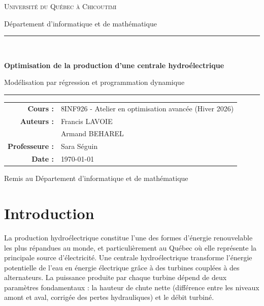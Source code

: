 \documentclass[12pt, letterpaper]{report}
\begin{document}
\begin{titlepage}
  \centering
  \vspace*{2cm}

  {\Large\scshape Université du Québec à Chicoutimi\par}
  \vspace{0.4cm}
  {\normalsize Département d'informatique et de mathématique\par}

  \vspace{2.5cm}

  \rule{\linewidth}{0.6pt}\\[0.6em]
  {\LARGE\bfseries\color{accent} Optimisation de la production d'une centrale hydroélectrique\par}
  \vspace{0.3em}
  {\large Modélisation par régression et programmation dynamique\par}
  \rule{\linewidth}{0.6pt}

  \vspace{2cm}

  \begin{tabular}{rl}
    \textbf{Cours :} & 8INF926 - Atelier en optimisation avancée (Hiver 2026) \\[4pt]
    \textbf{Auteurs :} & Francis LAVOIE \\
                       & Armand BEHAREL \\[4pt]
    \textbf{Professeure :} & Sara Séguin \\[8pt]
    \textbf{Date :} & \today \\
  \end{tabular}

  \vfill

  {\small\textcolor{codegray}{Remis au Département d'informatique et de mathématique}}

\end{titlepage}
\tableofcontents
\newpage

\chapter{Introduction}

La production hydroélectrique constitue l'une des formes d'énergie renouvelable les plus répandues au monde, et particulièrement au Québec où elle représente la principale source d'électricité. Une centrale hydroélectrique transforme l'énergie potentielle de l'eau en énergie électrique grâce à des turbines couplées à des alternateurs. La puissance produite par chaque turbine dépend de deux paramètres fondamentaux : la hauteur de chute nette (différence entre les niveaux amont et aval, corrigée des pertes hydrauliques) et le débit turbiné.
\end{document}
